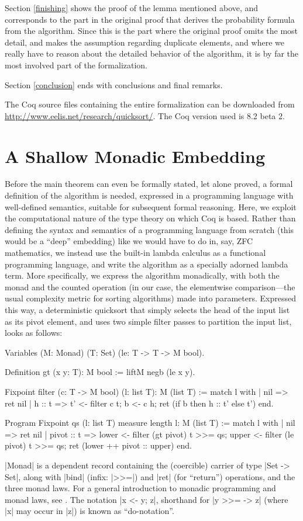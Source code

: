\documentclass[runningheads]{llncs}
\begin{document}
Section \ref{finishing} shows the proof of the lemma mentioned above, and corresponds to the part in the original proof that derives the probability formula from the algorithm. Since this is the part where the original proof omits the most detail, and makes the assumption regarding duplicate elements, and where we really have to reason about the detailed behavior of the algorithm, it is by far the most involved part of the formalization.

Section \ref{conclusion} ends with conclusions and final remarks.

The Coq source files containing the entire formalization can be downloaded from \url{http://www.eelis.net/research/quicksort/}. The Coq version used is 8.2 beta 2.

\section{A Shallow Monadic Embedding}
\label{embed}

Before the main theorem can even be formally stated, let alone proved, a formal definition of the algorithm is needed, expressed in a programming language with well-defined semantics, suitable for subsequent formal reasoning. Here, we exploit the computational nature of the type theory on which Coq is based. Rather than defining the syntax and semantics of a programming language from scratch (this would be a ``deep'' embedding) like we would have to do in, say, ZFC mathematics, we instead use the built-in lambda calculus as a functional programming language, and write the algorithm as a specially adorned lambda term. More specifically, we express the algorithm monadically, with both the monad and the counted operation (in our case, the elementwise comparison---the usual complexity metric for sorting algorithms) made into parameters. Expressed this way, a deterministic quicksort that simply selects the head of the input list as its pivot element, and uses two simple filter passes to partition the input list, looks as follows:

\begin{code}
  Variables (M: Monad) (T: Set) (le: T -> T -> M bool).

  Definition gt (x y: T): M bool := liftM negb (le x y).

  Fixpoint filter (c: T -> M bool) (l: list T): M (list T) :=
    match l with
    | nil => ret nil
    | h :: t =>
      t' <- filter c t;
      b <- c h;
      ret (if b then h :: t' else t')
    end.

  Program Fixpoint qs (l: list T) {measure length l}: M (list T) :=
    match l with
    | nil => ret nil
    | pivot :: t =>
        lower <- filter (gt pivot) t >>= qs;
        upper <- filter (le pivot) t >>= qs;
        ret (lower ++ pivot :: upper)
    end.
\end{code}
|Monad| is a dependent record containing the (coercible) carrier of type |Set -> Set|, along with |bind| (infix: |>>=|) and |ret| (for ``return'') operations, and the three monad laws. For a general introduction to monadic programming and monad laws, see \cite{wadler93monads}. The notation |x <- y; z|, shorthand for |y >>= \x -> z| (where |x| may occur in |z|) is known as ``do-notation''.
\end{document}
